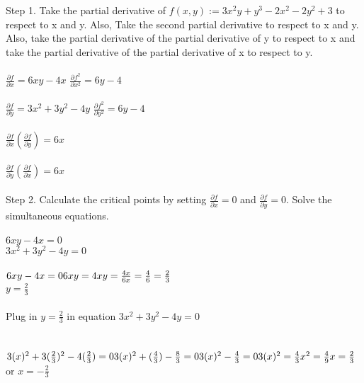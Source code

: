 \documentclass{article}
\begin{document}
\begin{enumerate}[14.]
Step 1. Take the partial derivative of $f(x,y) := 3x^{2}y+y^{3}-2x^{2}-2y^{2}+3$ to respect to x and y. Also, Take the second partial derivative to respect to x and y. Also, take the partial derivative of the partial derivative of y to respect to x and take the partial derivative of the partial derivative of x to respect to y.
\\
\\
$\frac{\partial{f}}{\partial{x}}=6xy-4x$          \hspace{2.9cm}$\frac{\partial{f^{2}}}{\partial{x^{2}}}=6y-4$\\
\\
$\frac{\partial{f}}{\partial{y}}=3x^{2}+3y^{2}-4y$ \hspace{2cm}$\frac{\partial{f^{2}}}{\partial{y^{2}}}=6y-4$\\
\\
$\frac{\partial{f}}{\partial{x}}(\frac{\partial{f}}{\partial{y}})=6x$\\
\\
$\frac{\partial{f}}{\partial{y}}(\frac{\partial{f}}{\partial{x}})=6x$ \\
\\
Step 2. Calculate the critical points by setting $\frac{\partial{f}}{\partial{x}}=0$ and $\frac{\partial{f}}{\partial{y}}=0$. Solve the simultaneous equations.\\
\\
$6xy-4x=0$\\
$3x^{2}+3y^{2}-4y=0$
\\
\\
$6xy-4x=0\\6xy=4x\\y=\frac{4x}{6x}=\frac{4}{6}=\frac{2}{3}$\\
$y=\frac{2}{3}$\\
\\
Plug in $y=\frac{2}{3}$ in equation $3x^{2}+3y^{2}-4y=0$\\
\\
\\$ 3(x)^{2}+3(\frac{2}{3})^{2}-4(\frac{2}{3})=0 \\ 3(x)^{2}+(\frac{4}{3})-\frac{8}{3}=0\\ \\ 3(x)^{2}-\frac{4}{3}=0 \\ 3(x)^{2}=\frac{4}{3} \\ x^{2}=\frac{4}{9} \\ \\ x=\frac{2}{3}$ or $x=-\frac{2}{3}$ \\
\\

\end{enumerate}
\end{document}
